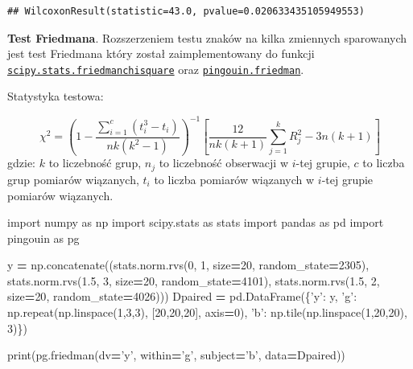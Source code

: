 \documentclass[polish,]{book}
\newenvironment{Shaded}{\begin{snugshade}}{\end{snugshade}}
\newcommand{\BuiltInTok}[1]{#1}
\newcommand{\DecValTok}[1]{\textcolor[rgb]{0.00,0.00,0.81}{#1}}
\newcommand{\FloatTok}[1]{\textcolor[rgb]{0.00,0.00,0.81}{#1}}
\newcommand{\ImportTok}[1]{#1}
\newcommand{\NormalTok}[1]{#1}
\newcommand{\OperatorTok}[1]{\textcolor[rgb]{0.81,0.36,0.00}{\textbf{#1}}}
\newcommand{\StringTok}[1]{\textcolor[rgb]{0.31,0.60,0.02}{#1}}
\begin{document}
\begin{verbatim}
## WilcoxonResult(statistic=43.0, pvalue=0.020633435105949553)
\end{verbatim}

\textbf{Test Friedmana}. Rozszerzeniem testu znaków na kilka zmiennych sparowanych jest test Friedmana który został zaimplementowany do funkcji \href{https://docs.scipy.org/doc/scipy/reference/generated/scipy.stats.friedmanchisquare.html}{\texttt{scipy.stats.friedmanchisquare}} oraz
\href{https://pingouin-stats.org/generated/pingouin.friedman.html\#pingouin.friedman}{\texttt{pingouin.friedman}}.

Statystyka testowa:

\begin{equation}
\chi^2=\left(1-\frac{\sum_{i=1}^{c}(t^3_i-t_i)}{nk(k^2-1)}\right)^{-1}\left[\frac{12}{nk(k+1)}\sum_{j=1}^{k}R^2_j-3n(k+1)\right]
\label{eq:dep07}
\end{equation}
gdzie: \(k\) to liczebność grup, \(n_j\) to liczebność obserwacji w \(i\)-tej grupie, \(c\) to liczba grup pomiarów wiązanych, \(t_i\) to liczba pomiarów wiązanych w \(i\)-tej grupie pomiarów wiązanych.

\begin{Shaded}
\begin{Highlighting}[]
\ImportTok{import}\NormalTok{ numpy }\ImportTok{as}\NormalTok{ np}
\ImportTok{import}\NormalTok{ scipy.stats }\ImportTok{as}\NormalTok{ stats}
\ImportTok{import}\NormalTok{ pandas }\ImportTok{as}\NormalTok{ pd}
\ImportTok{import}\NormalTok{ pingouin }\ImportTok{as}\NormalTok{ pg}
  
\NormalTok{y }\OperatorTok{=}\NormalTok{ np.concatenate((stats.norm.rvs(}\DecValTok{0}\NormalTok{, }\DecValTok{1}\NormalTok{, size}\OperatorTok{=}\DecValTok{20}\NormalTok{, random_state}\OperatorTok{=}\DecValTok{2305}\NormalTok{),}
\NormalTok{                    stats.norm.rvs(}\FloatTok{1.5}\NormalTok{, }\DecValTok{3}\NormalTok{, size}\OperatorTok{=}\DecValTok{20}\NormalTok{, random_state}\OperatorTok{=}\DecValTok{4101}\NormalTok{),}
\NormalTok{                    stats.norm.rvs(}\FloatTok{1.5}\NormalTok{, }\DecValTok{2}\NormalTok{, size}\OperatorTok{=}\DecValTok{20}\NormalTok{, random_state}\OperatorTok{=}\DecValTok{4026}\NormalTok{)))}
\NormalTok{Dpaired }\OperatorTok{=}\NormalTok{ pd.DataFrame(\{}\StringTok{'y'}\NormalTok{: y,}
                        \StringTok{'g'}\NormalTok{: np.repeat(np.linspace(}\DecValTok{1}\NormalTok{,}\DecValTok{3}\NormalTok{,}\DecValTok{3}\NormalTok{), [}\DecValTok{20}\NormalTok{,}\DecValTok{20}\NormalTok{,}\DecValTok{20}\NormalTok{], axis}\OperatorTok{=}\DecValTok{0}\NormalTok{),}
                        \StringTok{'b'}\NormalTok{: np.tile(np.linspace(}\DecValTok{1}\NormalTok{,}\DecValTok{20}\NormalTok{,}\DecValTok{20}\NormalTok{), }\DecValTok{3}\NormalTok{)\})}
                              
\BuiltInTok{print}\NormalTok{(pg.friedman(dv}\OperatorTok{=}\StringTok{'y'}\NormalTok{, within}\OperatorTok{=}\StringTok{'g'}\NormalTok{, subject}\OperatorTok{=}\StringTok{'b'}\NormalTok{, data}\OperatorTok{=}\NormalTok{Dpaired))}
\end{Highlighting}
\end{Shaded}
\end{document}
